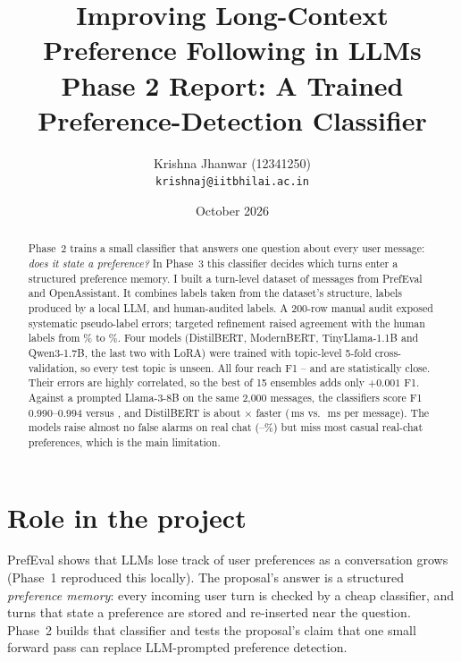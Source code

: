 \documentclass[11pt,a4paper]{article}
\title{\textbf{Improving Long-Context Preference Following in LLMs}\\[2pt]
\large Phase 2 Report: A Trained Preference-Detection Classifier}
\author{Krishna Jhanwar (12341250)\\ \small\texttt{krishnaj@iitbhilai.ac.in}}
\date{October 2026}
\begin{document}
\maketitle

\begin{abstract}
\noindent
Phase~2 trains a small classifier that answers one question about every user message: \emph{does it state a preference?}
In Phase~3 this classifier decides which turns enter a structured preference memory. I built a turn-level dataset of
\pRows{} messages from PrefEval and OpenAssistant. It combines \pGold{} labels taken from the dataset's structure, \pPseudo{}
labels produced by a local LLM, and \pAudited{} human-audited labels. A 200-row manual audit exposed systematic pseudo-label errors;
targeted refinement raised agreement with the human labels from \pAuditBefore\% to \pAuditAfter\%. Four models (DistilBERT, ModernBERT,
TinyLlama-1.1B and Qwen3-1.7B, the last two with LoRA) were trained with topic-level 5-fold cross-validation, so every test
topic is unseen. All four reach F1 \pFOneLo--\pFOneHi{} and are statistically close. Their errors are highly correlated, so the best of 15
ensembles adds only $+0.001$ F1. Against a prompted Llama-3-8B on the same 2{,}000 messages, the classifiers score F1 0.990--0.994 versus
\pLlmFOne, and DistilBERT is about \pSpeedup$\times$ faster (\pDistilLat\,ms vs.\ \pLlmLat\,ms per message). The models raise almost no
false alarms on real chat (\pOodLo--\pOodHi\%) but miss most casual real-chat preferences, which is the main limitation.
\end{abstract}

\section{Role in the project}
PrefEval shows that LLMs lose track of user preferences as a conversation grows (Phase~1 reproduced this locally). The proposal's
answer is a structured \emph{preference memory}: every incoming user turn is checked by a cheap classifier, and turns that state
a preference are stored and re-inserted near the question. Phase~2 builds that classifier and tests the proposal's claim that one small
forward pass can replace LLM-prompted preference detection.

\end{document}
